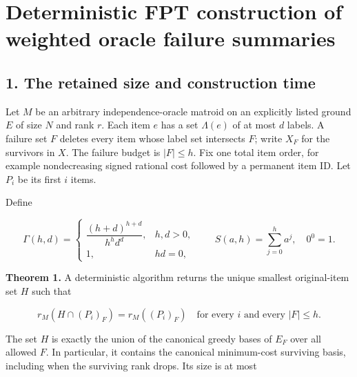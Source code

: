 
\hypertarget{af-eb38c0014f-deterministic-fpt-construction-of-weighted-oracle-failure-summaries}{%
\section{Deterministic FPT construction of weighted oracle failure summaries}\label{af-eb38c0014f-deterministic-fpt-construction-of-weighted-oracle-failure-summaries}}

\hypertarget{af-eb38c0014f-the-retained-size-and-construction-time}{%
\subsection{1. The retained size and construction time}\label{af-eb38c0014f-the-retained-size-and-construction-time}}

Let \(M\) be an arbitrary independence-oracle matroid on an explicitly listed ground \(E\) of size \(N\) and rank \(r\). Each item \(e\) has a set \(\Lambda(e)\) of at most \(d\) labels. A failure set \(F\) deletes every item whose label set intersects \(F\); write \(X_F\) for the survivors in \(X\). The failure budget is \(|F|\le h\). Fix one total item order, for example nondecreasing signed rational cost followed by a permanent item ID. Let \(P_i\) be its first \(i\) items.

Define

\[
\Gamma(h,d)=
\begin{cases}
\dfrac{(h+d)^{h+d}}{h^h d^d},&h,d>0,\\
1,&hd=0,
\end{cases}
\qquad
S(a,h)=\sum_{j=0}^{h}a^j,
\quad 0^0=1.
\tag{WP1}
\]

\textbf{Theorem 1.} A deterministic algorithm returns the unique smallest original-item set \(H\) such that

\[
r_M(H\cap(P_i)_F)=r_M((P_i)_F)
\quad\text{for every }i\text{ and every }|F|\le h.
\tag{WP2}
\]

The set \(H\) is exactly the union of the canonical greedy bases of \(E_F\) over all allowed \(F\). In particular, it contains the canonical minimum-cost surviving basis, including when the surviving rank drops. Its size is at most

